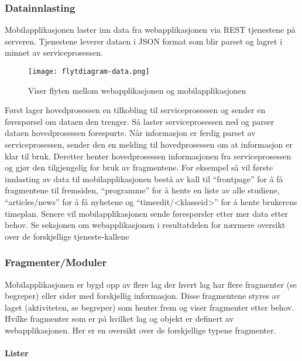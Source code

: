\documentclass[../main.tex]{subfiles}
\begin{document}
\subsubsection{Datainnlasting}

Mobilapplikasjonen laster inn data fra webapplikasjonen via REST tjenestene på serveren. Tjenestene leverer dataen i JSON format som blir parset og lagret i minnet av serviceprosessen.

\begin{figure}[H]
  \centering
  \texttt{[image: flytdiagram-data.png]}
  \caption{Viser flyten mellom webapplikasjonen og mobilapplikasjonen}
\end{figure}

Først lager hovedprosessen en tilkobling til serviceprosessen og sender en førespørsel om dataen den trenger. Så laster serviceprosessen ned og parser dataen hovedprosessen forespurte. Når informasjon er ferdig parset av serviceprosessen, sender den en melding til hovedprosessen om at informasjon er klar til bruk. Deretter henter hovedprosessen informasjonen fra serviceprosessen og gjør den tilgjengelig for bruk av fragmentene.\newline
For eksempel så vil første innlasting av data til mobilapplikasjonen bestå av kall til “frontpage” for å få fragmentene til fremsiden, “programme” for å hente en liste av alle studiene, “articles/news” for å få nyhetene og “timeedit/<klasseid>” for å hente brukerens timeplan. Senere vil mobilapplikasjonen sende førespørsler etter mer data etter behov. Se seksjonen om webapplikasjonen i resultatdelen for nærmere oversikt over de forskjellige tjeneste-kallene

\subsubsection{Fragmenter/Moduler}

Mobilapplikasjonen er bygd opp av flere lag der hvert lag har flere fragmenter (se begreper) eller sider med forskjellig informasjon. Disse fragmentene styres av laget (aktiviteten, se begreper) som henter frem og viser fragmenter etter behov. Hvilke fragmenter som er på hvilket lag og objekt er definert av webapplikasjonen. Her er en oversikt over de forskjellige typene fragmenter.

\paragraph{Lister}
\end{document}
